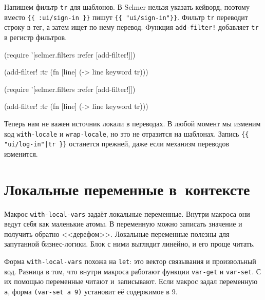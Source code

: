 \fi

Напишем фильтр \verb|tr| для шаблонов. В Selmer нельзя указать кейворд,
поэтому вместо \verb|{{ :ui/sign-in }}| пишут \verb|{{ "ui/sign-in"}}|.
Фильтр \verb|tr| переводит строку в тег, а затем ищет по нему
перевод. Функция \verb|add-filter!| добавляет \verb|tr| в регистр фильтров.

\ifx\DEVICETYPE\MOBILE

\begin{english}
  \begin{clojure}
(require
 '[selmer.filters :refer [add-filter!]])

(add-filter! :tr
 (fn [line]
   (-> line keyword tr)))
  \end{clojure}
\end{english}

\else

\begin{english}
  \begin{clojure}
(require '[selmer.filters :refer [add-filter!]])

(add-filter! :tr
 (fn [line]
   (-> line keyword tr)))
  \end{clojure}
\end{english}

\fi

Теперь нам не важен источник локали в переводах. В любой момент мы изменим код
\verb|with-locale| и \verb|wrap-locale|, но это не отразится на
шаблонах. Запись \verb={{ "ui/log-in"|tr }}= останется прежней, даже если
механизм переводов изменится.

\section{Локальные переменные в~контексте}


Макрос \verb|with-local-vars| задаёт локальные переменные. Внутри макроса
они ведут себя как маленькие атомы. В переменную можно записать значение и
получить обратно <<дерефом>>. Локальные переменные полезны для запутанной
бизнес-логики. Блок с ними выглядит линейно, и его проще читать.

Форма \verb|with-local-vars| похожа на \verb|let|: это вектор связывания и
произвольный код. Разница в том, что внутри макроса работают функции
\verb|var-get| и \verb|var-set|. С их помощью переменные читают
и~записывают. Если макрос задал переменную \verb|a|, форма \verb|(var-set a 9)|
установит её содержимое в 9.

